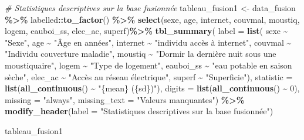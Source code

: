 \documentclass[
]{article}
\newenvironment{Shaded}{\begin{snugshade}}{\end{snugshade}}
\newcommand{\AttributeTok}[1]{\textcolor[rgb]{0.13,0.29,0.53}{#1}}
\newcommand{\CommentTok}[1]{\textcolor[rgb]{0.56,0.35,0.01}{\textit{#1}}}
\newcommand{\DecValTok}[1]{\textcolor[rgb]{0.00,0.00,0.81}{#1}}
\newcommand{\FunctionTok}[1]{\textcolor[rgb]{0.13,0.29,0.53}{\textbf{#1}}}
\newcommand{\NormalTok}[1]{#1}
\newcommand{\OtherTok}[1]{\textcolor[rgb]{0.56,0.35,0.01}{#1}}
\newcommand{\SpecialCharTok}[1]{\textcolor[rgb]{0.81,0.36,0.00}{\textbf{#1}}}
\newcommand{\StringTok}[1]{\textcolor[rgb]{0.31,0.60,0.02}{#1}}
\begin{document}
\begin{Shaded}
\begin{Highlighting}[]
\CommentTok{\# Statistiques descriptives sur la base fusionnée}
\NormalTok{tableau\_fusion1 }\OtherTok{\textless{}{-}}\NormalTok{ data\_fusion }\SpecialCharTok{\%\textgreater{}\%}
\NormalTok{  labelled}\SpecialCharTok{::}\FunctionTok{to\_factor}\NormalTok{() }\SpecialCharTok{\%\textgreater{}\%}
  \FunctionTok{select}\NormalTok{(sexe, age, internet, couvmal, moustiq, logem, eauboi\_ss, elec\_ac, superf)}\SpecialCharTok{\%\textgreater{}\%}
\FunctionTok{tbl\_summary}\NormalTok{(    }
  \AttributeTok{label =} \FunctionTok{list}\NormalTok{(}
\NormalTok{      sexe }\SpecialCharTok{\textasciitilde{}} \StringTok{"Sexe"}\NormalTok{,}
\NormalTok{      age }\SpecialCharTok{\textasciitilde{}} \StringTok{"Âge en années"}\NormalTok{,}
\NormalTok{      internet }\SpecialCharTok{\textasciitilde{}} \StringTok{"individu accès à internet"}\NormalTok{,}
\NormalTok{      couvmal }\SpecialCharTok{\textasciitilde{}} \StringTok{"Individu couverture maladie"}\NormalTok{,}
\NormalTok{      moustiq }\SpecialCharTok{\textasciitilde{}} \StringTok{"Dormir la dernière nuit sous une moustiquaire"}\NormalTok{,}
\NormalTok{      logem }\SpecialCharTok{\textasciitilde{}} \StringTok{"Type de logement"}\NormalTok{,}
\NormalTok{      eauboi\_ss }\SpecialCharTok{\textasciitilde{}} \StringTok{"eau potable en saison sèche"}\NormalTok{,}
\NormalTok{      elec\_ac }\SpecialCharTok{\textasciitilde{}} \StringTok{"Accès au réseau électrique"}\NormalTok{,}
\NormalTok{      superf }\SpecialCharTok{\textasciitilde{}} \StringTok{"Superficie"}\NormalTok{),}
    \AttributeTok{statistic =} \FunctionTok{list}\NormalTok{(}\FunctionTok{all\_continuous}\NormalTok{() }\SpecialCharTok{\textasciitilde{}} \StringTok{"\{mean\} (\{sd\})"}\NormalTok{),}
    \AttributeTok{digits =} \FunctionTok{list}\NormalTok{(}\FunctionTok{all\_continuous}\NormalTok{() }\SpecialCharTok{\textasciitilde{}} \DecValTok{0}\NormalTok{),}
    \AttributeTok{missing =} \StringTok{"always"}\NormalTok{,}
    \AttributeTok{missing\_text =} \StringTok{"Valeurs manquantes"}\NormalTok{) }\SpecialCharTok{\%\textgreater{}\%}
   \FunctionTok{modify\_header}\NormalTok{(}\AttributeTok{label =} \StringTok{"Statistiques descriptives sur la base fusionnée"}\NormalTok{)}

\NormalTok{tableau\_fusion1}
\end{Highlighting}
\end{Shaded}
\end{document}
